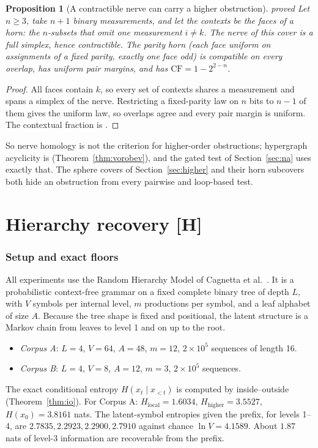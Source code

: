 \documentclass[11pt]{article}
\newtheorem{proposition}[theorem]{Proposition}
\theoremstyle{definition}
\theoremstyle{remark}
\newcommand{\CF}{\mathrm{CF}}
\newcommand{\src}[1]{\textsf{\small[#1]}}
\newcommand{\st}[1]{\textsf{\small\color{gray}#1}}
\begin{document}
\begin{proposition}[A contractible nerve can carry a higher obstruction]\label{prop:horncontract}\st{proved}
Let $n\ge3$, take $n+1$ binary measurements, and let the contexts be the faces of a horn: the $n$-subsets that omit one measurement $i\ne k$. The nerve of this cover is a full simplex, hence contractible. The parity horn (each face uniform on assignments of a fixed parity, exactly one face odd) is compatible on every overlap, has uniform pair margins, and has $\CF=1-2^{2-n}$.
\end{proposition}
\begin{proof}
All faces contain $k$, so every set of contexts shares a measurement and spans a simplex of the nerve. Restricting a fixed-parity law on $n$ bits to $n-1$ of them gives the uniform law, so overlaps agree and every pair margin is uniform. The contextual fraction is \cite[Thm.~4.3]{awasthiC}.
\end{proof}
So nerve homology is not the criterion for higher-order obstructions; hypergraph acyclicity is (Theorem~\ref{thm:vorobev}), and the gated test of Section~\ref{sec:na} uses exactly that. The sphere covers of Section~\ref{sec:higher} and their horn subcovers both hide an obstruction from every pairwise and loop-based test.

\part{Hierarchy recovery \src{H}}\label{part:hier}
\section{Setup and exact floors}

All experiments use the Random Hierarchy Model of Cagnetta et al.~\cite{cagnetta}. It is a probabilistic context-free grammar on a fixed complete binary tree of depth $L$, with $V$ symbols per internal level, $m$ productions per symbol, and a leaf alphabet of size $A$. Because the tree shape is fixed and positional, the latent structure is a Markov chain from leaves to level 1 and on up to the root.
\begin{itemize}
  \item \emph{Corpus A}: $L=4$, $V=64$, $A=48$, $m=12$, $2\times10^5$ sequences of length 16.
  \item \emph{Corpus B}: $L=4$, $V=8$, $A=12$, $m=3$, $2\times10^5$ sequences.
\end{itemize}
The exact conditional entropy $H(x_t\mid x_{<t})$ is computed by inside--outside (Theorem~\ref{thm:io}). For Corpus A: $H_{\text{local}}=1.6034$, $H_{\text{higher}}=3.5527$, $H(x_0)=3.8161$ nats. The latent-symbol entropies given the prefix, for levels 1--4, are $2.7835,2.2923,2.2900,2.7910$ against chance $\ln V=4.1589$. About $1.87$ nats of level-3 information are recoverable from the prefix.
\end{document}
